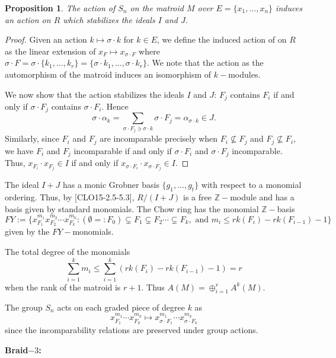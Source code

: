 \documentclass[12pt]{article}
\newtheorem{proposition}{Proposition}[section]
\begin{document}
\begin{proposition}
    The action of $S_n$ on the matroid $M$ over $E=\{x_1,\ldots,x_n\}$ induces an action on $R$ which stabilizes the ideals $I$ and $J$.
\end{proposition}
\begin{proof}
    Given an action $k \mapsto \sigma\cdot k$ for $k\in E$, we define the induced action of on $R$ as the linear extension of
    $x_F \mapsto x_{\sigma\cdot F}$ where $\sigma\cdot F = \sigma\cdot\{k_1,\ldots, k_r\}=\{\sigma\cdot k_1,\ldots,\sigma\cdot k_r\}$.
    We note that the action as the automorphism of the matroid induces an isomorphism of $k-$modules.

    \vspace*{3mm}
    We now show that the action stabilizes the ideals $I$ and $J$:
    $F_j$ contains $F_i$ if and only if $\sigma\cdot F_j$ contains $\sigma \cdot F_i$. Hence
    $$\sigma\cdot \alpha_k=\sum_{\sigma\cdot F_j \ni \sigma\cdot k}{\sigma\cdot F_j} =\alpha_{\sigma\cdot k}\in J.$$
    Similarly, since $F_i$ and $F_j$ are incomparable precisely when $F_i\nsubseteq F_j$ and $F_j\nsubseteq F_i$,
    we have $F_i$ and $F_j$ incomparable if and only if $\sigma\cdot F_i$ and $\sigma\cdot F_j$ incomparable.
    Thus, $x_{F_i}\cdot x_{F_j}\in I$ if and only if $x_{\sigma\cdot F_i}\cdot x_{\sigma\cdot F_j}\in I$.
\end{proof}

The ideal $I+J$ has a monic Grobner basis $\{g_1,\ldots,g_t\}$ with respect to a monomial ordering. Thus, by [CLO15-2.5-5.3],
$R/(I+J)$ is a free $\mathbb{Z}-$module and has a basis given by standard monomials.
The Chow ring has the monomial $\mathbb{Z}-$basis
$$FY:=\{x_{F_1}^{m_1}x_{F_2}^{m_2}\cdots x_{F_k}^{m_k}: (\emptyset=:F_0)\subsetneq F_1\subsetneq F_2\cdots\subsetneq F_k, \text{ and }
    m_i\leq rk(F_i)-rk(F_{i-1})-1\}$$
given by the $FY-$monomials.

\vspace*{3mm}
The total degree of the monomials
$$\sum_{i=1}^{k}{m_i}\leq\sum_{i=1}^{k}{(rk(F_i)-rk(F_{i-1})-1)}=r$$
when the rank of the matroid is $r+1$.
Thus $A(M)=\oplus_{i=1}^{r}{A^k(M)}$.

\vspace*{3mm}
The group $S_n$ acts on each graded piece of degree $k$ as
$$x_{F_1}^{m_1}\cdots x_{F_k}^{m_k}\mapsto
x_{\sigma\cdot F_1}^{m_1}\cdots x_{\sigma\cdot F_k}^{m_k}$$
since
the incomparability relations are preserved under group actions.

\vspace*{3mm}
\textbf{Braid$-3$:}
\end{document}
